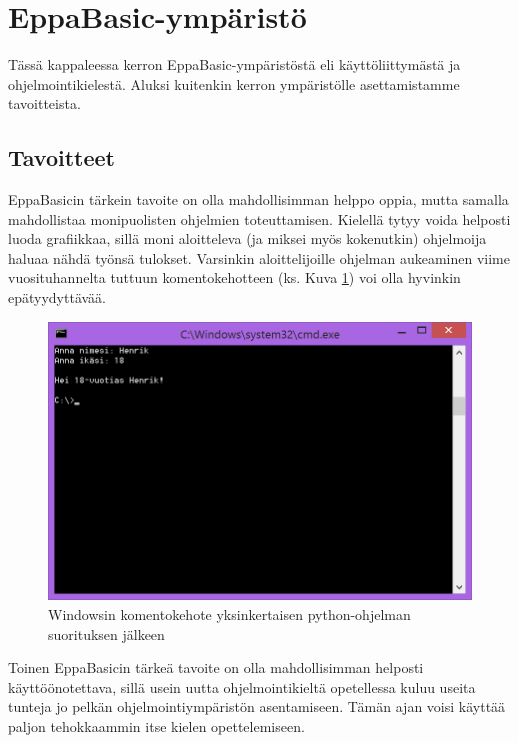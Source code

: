 \section{EppaBasic-ympäristö}

Tässä kappaleessa kerron EppaBasic-ympäristöstä
eli käyttöliittymästä ja ohjelmointikielestä.
Aluksi kuitenkin kerron ympäristölle
asettamistamme tavoitteista.

\subsection{Tavoitteet}
EppaBasicin tärkein tavoite on olla
mahdollisimman helppo oppia,
mutta samalla mahdollistaa
monipuolisten ohjelmien toteuttamisen.
Kielellä tytyy voida helposti luoda grafiikkaa,
sillä moni aloitteleva (ja miksei myös kokenutkin)
ohjelmoija haluaa nähdä työnsä tulokset.
Varsinkin aloittelijoille ohjelman aukeaminen
viime vuosituhannelta tuttuun komentokehotteen
(ks. Kuva \ref{img:cmd})
voi olla hyvinkin epätyydyttävää.

\begin{figure}[h]
    \centering
    \includegraphics[width=1\textwidth]{cmd}
    \caption{Windowsin komentokehote yksinkertaisen python-ohjelman suorituksen jälkeen}
    \label{img:cmd}
\end{figure}

Toinen EppaBasicin tärkeä tavoite on olla
mahdollisimman helposti käyttöönotettava,
sillä usein uutta ohjelmointikieltä opetellessa
kuluu useita tunteja jo pelkän
ohjelmointiympäristön asentamiseen.
Tämän ajan voisi käyttää paljon tehokkaammin
itse kielen opettelemiseen.

